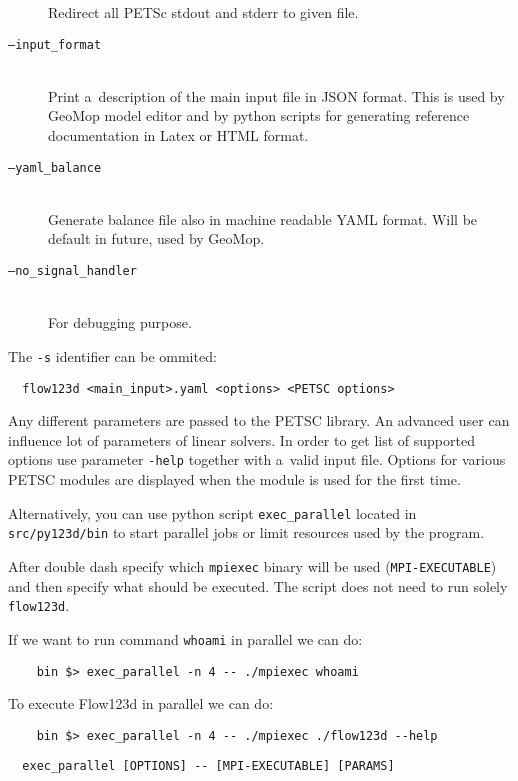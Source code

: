 \begin{description}
        Redirect all PETSc stdout and stderr to given file.
 \item[{\tt --input\_format}] \hfill\\
        Print a~description of the main input file in JSON format.
        This is used by GeoMop model editor and by python scripts for
        generating reference documentation in Latex or HTML format.
 \item[{\tt --yaml\_balance}] \hfill\\
        Generate balance file also in machine readable YAML format. Will be default in future, used by GeoMop.
 \item[{\tt --no\_signal\_handler}] \hfill\\
        For debugging purpose.
\end{description}

The {\tt -s} identifier can be ommited:
\begin{verbatim}
  flow123d <main_input>.yaml <options> <PETSC options>
\end{verbatim}

Any different parameters are passed to the PETSC library. An advanced user can influence lot of parameters of linear solvers. In order to get list of supported options
use parameter \verb'-help' together with a~valid input file. Options for various PETSC modules are displayed when the module is used for the first time.

Alternatively, you can use python script \verb'exec_parallel' located in \verb'src/py123d/bin' to start parallel jobs or limit resources used by the program.

After double dash specify which \verb'mpiexec' binary will be used (\verb'MPI-EXECUTABLE') and then specify what should be executed.
The script does not need to run solely \verb'flow123d'.

If we want to run command \verb'whoami' in parallel we can do:
\begin{verbatim}
	bin $> exec_parallel -n 4 -- ./mpiexec whoami
\end{verbatim}

To execute Flow123d in parallel we can do:
\begin{verbatim}
	bin $> exec_parallel -n 4 -- ./mpiexec ./flow123d --help
\end{verbatim}


\begin{verbatim}
  exec_parallel [OPTIONS] -- [MPI-EXECUTABLE] [PARAMS]
\end{verbatim}

